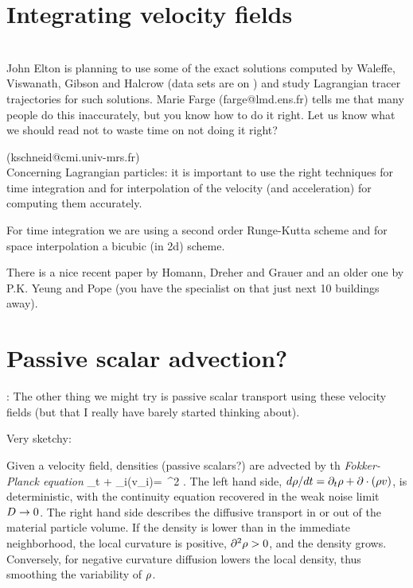 \section{Integrating velocity fields}
\label{ssect:IntVel}

\\
John Elton is planning to use some of
the exact {\pCf} solutions computed by Waleffe, Viswanath,
Gibson and Halcrow (data
sets are on )
and study Lagrangian tracer trajectories for such solutions. Marie Farge
(farge@lmd.ens.fr) tells me that many people do this
inaccurately, but you know how to do it right. Let us know what we
should read not to waste time
on not doing it right?

 (kschneid@cmi.univ-mrs.fr)\\
Concerning Lagrangian particles:
 it is important to use the right techniques for time integration
 and for interpolation of the velocity (and acceleration)
 for computing them accurately.

For time integration we are using a second order
Runge-Kutta scheme and for space interpolation a bicubic (in 2d) scheme.

There is a nice recent paper by Homann, Dreher and Grauer
and an older one by P.K. Yeung and Pope
(you have the specialist on that just next 10 buildings away).


\section{Passive scalar advection?}

:
The
other thing we might try is passive scalar transport using these
velocity fields (but that I really have barely started thinking
about).

Very sketchy:

Given a velocity field, densities (passive scalars?)
are advected by th  %
{\em Fokker-Planck equation}
\beq
\partial_t \msr + \partial_i(\msr v_i)=\DiffC \, \partial^2 \msr.
The left hand side,
$d\rho/dt = \partial_t \rho + \partial \cdot (\rho v) $,
is deterministic, with
the
{continuity equation} %
recovered in the weak noise limit $D\rightarrow 0$.
The right hand side describes the diffusive transport
in or out of the material particle volume.
If the density is lower than in
the immediate neighborhood, the local curvature is
positive, $\partial^2 \rho > 0$, and the density grows.
Conversely, for negative curvature
diffusion lowers the
local density, thus smoothing the variability of $\rho$.

